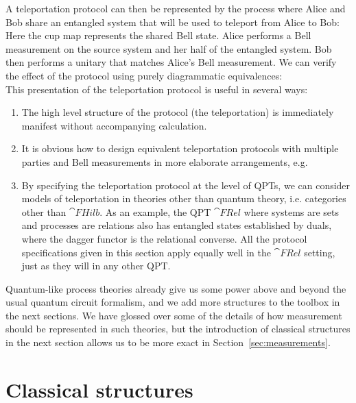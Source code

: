 \begin{example}
A teleportation protocol can then be represented by the process where Alice and Bob share an entangled system that will be used to teleport from Alice to Bob:
\begin{equation}

\end{equation}
Here the cup map represents the shared Bell state.  Alice performs a Bell measurement on the source system and her half of the entangled system. Bob then performs a unitary that matches Alice's Bell measurement. We can verify the effect of the protocol using purely diagrammatic equivalences:
\begin{equation}
\label{eq:teleportderive}

\end{equation}
This presentation of the teleportation protocol is useful in several ways:
\begin{enumerate}
\item The high level structure of the protocol (the teleportation) is immediately manifest without accompanying calculation.
\item It is obvious how to design equivalent teleportation protocols with multiple parties and Bell measurements in more elaborate arrangements, e.g.
\begin{equation}

\end{equation}
\item By specifying the teleportation protocol at the level of QPTs, we can consider models of teleportation in theories other than quantum theory, i.e. categories other than $\cat{FHilb}$. As an example, the QPT $\cat{FRel}$ where systems are sets and processes are relations also has entangled states established by duals, where the dagger functor is the relational converse. All the protocol specifications given in this section apply equally well in the $\cat{FRel}$ setting, just as they will in any other QPT.
\end{enumerate}
\end{example}

Quantum-like process theories already give us some power above and beyond the usual quantum circuit formalism, and we add more structures to the toolbox in the next sections.  We have glossed over some of the details of how measurement should be represented in such theories, but the introduction of classical structures in the next section allows us to be more exact in Section~\ref{sec:measurements}. 

\section{Classical structures}
\label{sec:observables}

